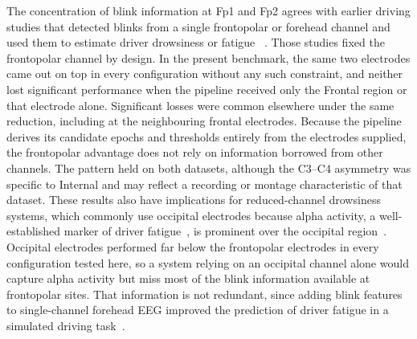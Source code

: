 \documentclass[journal,twoside,web]{ieeecolor}
\begin{document}
%
The concentration of blink information at Fp1 and Fp2 agrees with earlier driving studies that detected blinks from a single frontopolar or forehead channel and used them to estimate driver drowsiness or fatigue
~\citep{ko2020eyeblink,shahbakhti2022simultaneous,shahbakhti2023fusion}.
Those studies fixed the frontopolar channel by design. In the present benchmark, the same two electrodes came out on top in every configuration without any such constraint, and neither lost significant performance when the pipeline received only the Frontal region or that electrode alone. Significant losses were common elsewhere under the same reduction, including at the neighbouring frontal electrodes. Because the pipeline derives its candidate epochs and thresholds entirely from the electrodes supplied, the frontopolar advantage does not rely on information borrowed from other channels. The pattern held on both datasets, although the C3--C4 asymmetry was specific to Internal and may reflect a recording or montage characteristic of that dataset. These results also have implications for reduced-channel drowsiness systems, which commonly use occipital electrodes because alpha activity, a well-established marker of driver fatigue~\citep{simon2011eeg}, is prominent over the occipital region~\citep{lin2014wireless,li2015context}. Occipital electrodes performed far below the frontopolar electrodes in every configuration tested here, so a system relying on an occipital channel alone would capture alpha activity but miss most of the blink information available at frontopolar sites. That information is not redundant, since adding blink features to single-channel forehead EEG improved the prediction of driver fatigue in a simulated driving task~\citep{ko2020eyeblink}.
 
%
%
%
%
%
%
%

%
\end{document}
